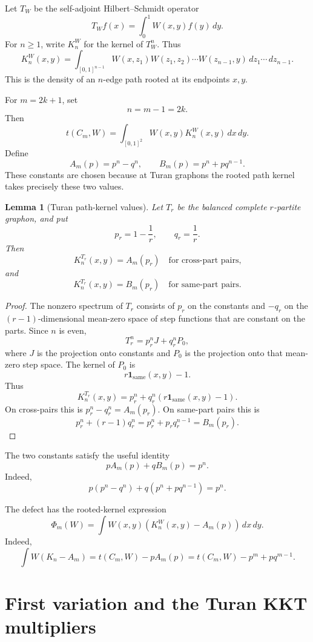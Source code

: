 \documentclass[11pt]{article}
\newtheorem{lemma}[theorem]{Lemma}
\theoremstyle{definition}
\newcommand{\same}{\mathrm{same}}
\newcommand{\dd}{\,d}
\begin{document}
Let $T_W$ be the self-adjoint Hilbert--Schmidt operator
\[
        T_W f(x)=\int_0^1 W(x,y)f(y)\dd y.
\]
For $n\ge1$, write $K_n^W$ for the kernel of $T_W^n$.  Thus
\[
        K_n^W(x,y)=\int_{[0,1]^{n-1}} W(x,z_1)W(z_1,z_2)\cdots W(z_{n-1},y)\dd z_1\cdots \dd z_{n-1}.
\]
This is the density of an $n$-edge path rooted at its endpoints $x,y$.

For $m=2k+1$, set
\[
        n=m-1=2k.
\]
Then
\[
        t(C_m,W)=\int_{[0,1]^2} W(x,y)K_n^W(x,y)\dd x\dd y.
\]
Define
\[
        A_m(p)=p^n-q^n,
        \qquad
        B_m(p)=p^n+p q^{n-1}.
\]
These constants are chosen because at Turan graphons the rooted path kernel takes precisely these two values.

\begin{lemma}[Turan path-kernel values]
Let $T_r$ be the balanced complete $r$-partite graphon, and put
\[
        p_r=1-\frac1r,
        \qquad q_r=\frac1r.
\]
Then
\[
        K_n^{T_r}(x,y)=A_m(p_r)
        \quad\text{for cross-part pairs,}
\]
and
\[
        K_n^{T_r}(x,y)=B_m(p_r)
        \quad\text{for same-part pairs.}
\]
\end{lemma}

\begin{proof}
The nonzero spectrum of $T_r$ consists of $p_r$ on the constants and $-q_r$ on the $(r-1)$-dimensional mean-zero space of step functions that are constant on the parts.  Since $n$ is even,
\[
        T_r^n=p_r^n J+q_r^n P_0,
\]
where $J$ is the projection onto constants and $P_0$ is the projection onto that mean-zero step space.  The kernel of $P_0$ is
\[
        r\mathbf 1_{\same}(x,y)-1.
\]
Thus
\[
        K_n^{T_r}(x,y)=p_r^n+q_r^n(r\mathbf 1_{\same}(x,y)-1).
\]
On cross-pairs this is $p_r^n-q_r^n=A_m(p_r)$.  On same-part pairs this is
\[
        p_r^n+(r-1)q_r^n=p_r^n+p_rq_r^{n-1}=B_m(p_r).
\]
\end{proof}

The two constants satisfy the useful identity
\[
        pA_m(p)+qB_m(p)=p^n.
\]
Indeed,
\[
        p(p^n-q^n)+q(p^n+pq^{n-1})=p^n.
\]

The defect has the rooted-kernel expression
\[
        \Phi_m(W)=\int W(x,y)(K_n^W(x,y)-A_m(p))\dd x\dd y.
\]
Indeed,
\[
        \int W(K_n-A_m)=t(C_m,W)-pA_m(p)=t(C_m,W)-p^{m}+pq^{m-1}.
\]

\section{First variation and the Turan KKT multipliers}
\end{document}
